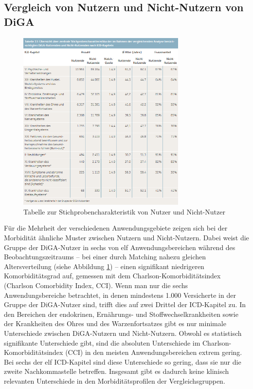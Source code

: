\documentclass{article}
\begin{document}
		\subsection{Vergleich von Nutzern und Nicht-Nutzern von DiGA}
			\begin{figure}[htbp]
				\centering
				\includegraphics[width=0.75\textwidth]{./grafiken/tabelle_vergleich_nutzer_nicht_nutzer_diga}
				\caption[Stichprobencharakteristik von Nutzer und Nicht-Nutzer]{Tabelle zur Stichprobencharakteristik von Nutzer und Nicht-Nutzer}
				\label{Tab-stichprobe-diga}
			\end{figure}
			Für die Mehrheit der verschiedenen Anwendungsgebiete zeigen sich bei der Morbidität ähnliche Muster zwischen Nutzern und Nicht-Nutzern. Dabei weist die Gruppe der DiGA-Nutzer in sechs von elf Anwendungsbereichen während des Beobachtungszeitraums – bei einer durch Matching nahezu gleichen Altersverteilung (siehe Abbildung \ref{Tab-stichprobe-diga}) – einen signifikant niedrigeren Komorbiditätsgrad auf, gemessen mit dem Charlson-Komorbiditätsindex (Charlson Comorbidity Index, CCI). Wenn man nur die sechs Anwendungsbereiche betrachtet, in denen mindestens 1.000 Versicherte in der Gruppe der DiGA-Nutzer sind, trifft dies auf zwei Drittel der ICD-Kapitel zu. In den Bereichen der endokrinen, Ernährungs- und Stoffwechselkrankheiten sowie der Krankheiten des Ohres und des Warzenfortsatzes gibt es nur minimale Unterschiede zwischen DiGA-Nutzern und Nicht-Nutzern. Obwohl es statistisch signifikante Unterschiede gibt, sind die absoluten Unterschiede im Charlson-Komorbiditätsindex (CCI) in den meisten Anwendungsbereichen extrem gering. Bei sechs der elf ICD-Kapitel sind diese Unterschiede so gering, dass sie nur die zweite Nachkommastelle betreffen. Insgesamt gibt es dadurch keine klinisch relevanten Unterschiede in den Morbiditätsprofilen der Vergleichsgruppen.\cite[vgl. S. 36]{TK-Report-2}
			
\end{document}
